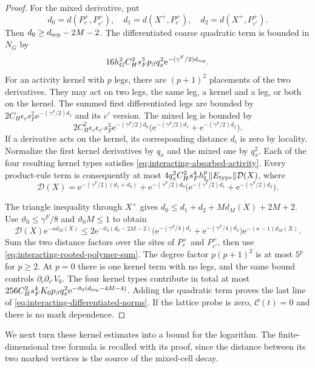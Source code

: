 \begin{proof}
For the mixed derivative, put
\[
 d_0=d(P_c^+,P_{c'}^+),\quad
 d_1=d(X^+,P_c^+),\quad d_2=d(X^+,P_{c'}^+).
\]
Then $d_0\ge d_{\rm sep}-2M-2$.
The differentiated coarse quadratic term is
bounded in $N_G$ by
\[
 16h_G^2C_H^2s_F^3p_\beta q_x^2
                                      \mathrm e^{-(\gamma^F/2)d_{\rm sep}}.
\]
For an activity kernel with $p$ legs, there
are $(p+1)^2$ placements of the two derivatives.
They may act on two legs, the same leg, a
kernel and a leg, or both on the kernel.
The summed first differentiated legs are
bounded by $2C_H\epsilon_cs_F^2\mathrm e^{-(\gamma^F/2)d_1}$
and its $c'$ version. The mixed leg is
bounded by
\[
 2C_H^2\epsilon_c\epsilon_{c'}s_F^3\mathrm e^{-(\gamma^F/2)d_0}
       \bigl(\mathrm e^{-(\gamma^F/2)d_1}+\mathrm e^{-(\gamma^F/2)d_2}\bigr).
\]
If a derivative acts on the kernel, its
corresponding distance $d_i$ is zero by
locality. Normalize the first kernel
derivatives by $q_x$ and the mixed one by
$q_x^2$. Each of the four resulting kernel
types satisfies \eqref{eq:interacting-absorbed-activity}.
Every product-rule term is consequently at most
$4q_x^2C_H^2s_F^4h_{\rm L}^p\|E_{\rm type}\|\mathcal D(X)$,
where
\[
 \mathcal D(X)=\mathrm e^{-(\gamma^F/2)(d_1+d_2)}
       +\mathrm e^{-(\gamma^F/2)d_0}
                  \bigl(\mathrm e^{-(\gamma^F/2)d_1}+\mathrm e^{-(\gamma^F/2)d_2}\bigr).
\]

The triangle inequality through $X^+$ gives
$d_0\le d_1+d_2+M d_M(X)+2M+2$.
Use $\vartheta_0\le\gamma^F/8$ and
$\vartheta_0M\le1$ to obtain
\[
 \mathcal D(X)\mathrm e^{-\kappa d_M(X)}
 \le2\mathrm e^{-\vartheta_0(d_0-2M-2)}
       \bigl(\mathrm e^{-(\gamma^F/4)d_1}+\mathrm e^{-(\gamma^F/4)d_2}\bigr)
                                \mathrm e^{-(\kappa-1)d_M(X)}.
\]
Sum the two distance factors over the sites
of $P_c^+$ and $P_{c'}^+$, then use
\eqref{eq:interacting-rooted-polymer-sum}.
The degree factor $p(p+1)^2$ is at most
$5^p$ for $p\ge2$. At $p=0$ there is
one kernel term with no legs, and the same
bound controls $\partial_c\partial_{c'}V_0$.
The four kernel types contribute in total
at most
$256C_H^2s_F^4K_0p_\beta q_x^2
\mathrm e^{-\vartheta_0(d_{\rm sep}-4M-4)}$.
Adding the quadratic term proves the last
line of \eqref{eq:interacting-differentiated-norms}.
If the lattice probe is zero, $\mathscr C(t)=0$
and there is no mark dependence.
\end{proof}

We next turn these kernel estimates into a bound
for the logarithm. The finite-dimensional tree
formula is recalled with its proof, since the
distance between its two marked vertices is
the source of the mixed-cell decay.

